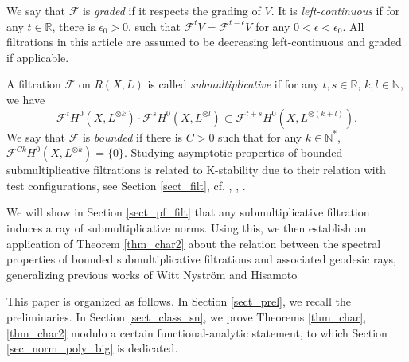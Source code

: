 \documentclass[12pt]{article}
\numberwithin{equation}{section}
\theoremstyle{theorem}
\theoremstyle{definition}
\theoremstyle{remark}
\newtheorem{rem}[thm]{Remark}
\newcommand{\real}{\mathbb{R}}
\newcommand{\nat}{\mathbb{N}}
\begin{document}
	We say that $\mathcal{F}$ is \textit{graded} if it respects the grading of $V$.
	It is \textit{left-continuous} if for any $t \in \real$, there is $\epsilon_0 > 0$, such that $\mathcal{F}^t V = \mathcal{F}^{t - \epsilon} V $ for any $0 < \epsilon < \epsilon_0$.
	All filtrations in this article are assumed to be decreasing left-continuous and graded if applicable.
	\par 
	A filtration $\mathcal{F}$ on $R(X, L)$ is called \textit{submultiplicative} %
	if for any $t, s \in \real$, $k, l \in \nat$, we have 
	\begin{equation}
		\mathcal{F}^t H^0(X, L^{\otimes k}) \cdot \mathcal{F}^s H^0(X, L^{\otimes l}) \subset \mathcal{F}^{t + s} H^0(X, L^{\otimes (k + l)}).
	\end{equation}
	We say that $\mathcal{F}$ is \textit{bounded} if there is $C > 0$ such that for any $k \in \nat^*$, $\mathcal{F}^{ C k} H^0(X, L^{\otimes k}) = \{0\}$.
	Studying asymptotic properties of bounded submultiplicative filtrations is related to K-stability due to their relation with test configurations, see Section \ref{sect_filt}, cf. \cite{NystOkounTest}, \cite{SzekeTestConf}, \cite{BouckJohn21}.
	\par 
	We will show in Section \ref{sect_pf_filt} that any submultiplicative filtration induces a ray of submultiplicative norms.
	Using this, we then establish an application of Theorem \ref{thm_char2} about the relation between the spectral properties of bounded submultiplicative filtrations and associated geodesic rays, generalizing previous works of Witt Nystr{\"o}m \cite{NystOkounTest} and Hisamoto \cite{HisamSpecMeas}
	\par
	This paper is organized as follows. 
	In Section \ref{sect_prel}, we recall the preliminaries.
	In Section \ref{sect_class_sn}, we prove Theorems \ref{thm_char}, \ref{thm_char2} modulo a certain functional-analytic statement, to which Section \ref{sec_norm_poly_big} is dedicated.
\end{document}
